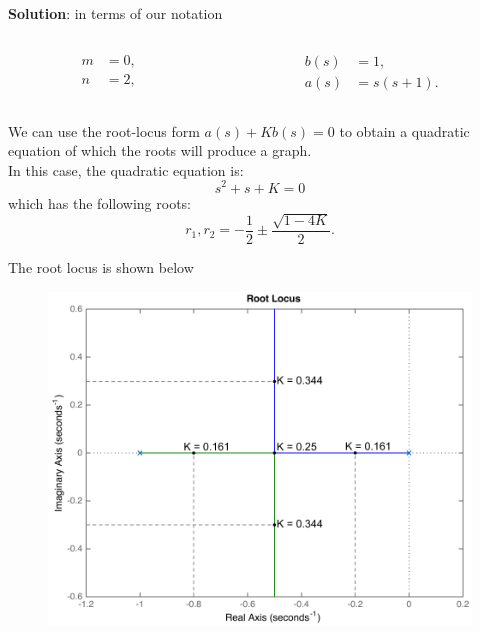 \begin{frame}
	\begin{exampleblock}{}
		\textbf{Solution}: in terms of our notation
		\vspace{-0.5em}
		\begin{columns}
			\begin{column}{0.2\textwidth}
				\begin{align*}
				m &=0,\\
				n &=2,
				\end{align*}
			\end{column}
			\hspace{-2cm}
			\begin{column}{0.2\textwidth}
				\begin{align*}
				b(s) &=1,\\
				a(s) &= s(s+1).
				\end{align*}
			\end{column}
		\end{columns}
		\vspace{1em}
		We can use the root-locus form $a(s) + Kb(s) = 0$ to obtain a quadratic equation of which the roots will produce a graph.\\ 
		In this case, the quadratic equation is:
		\begin{equation}
		s^2 + s + K = 0
		\end{equation}
		which has the following roots:
		\begin{equation}
		r_1,r_2 = -\frac{1}{2} \pm \frac{\sqrt{1 - 4K}}{2}.
		\end{equation}
	\end{exampleblock}
\end{frame}

\begin{frame}
	\begin{exampleblock}{}
		The root locus is shown below
		\begin{figure}
			\centering
			\includegraphics[width=0.7\linewidth]{root_locus_ex1}
		\end{figure}
	\end{exampleblock}
\end{frame}

